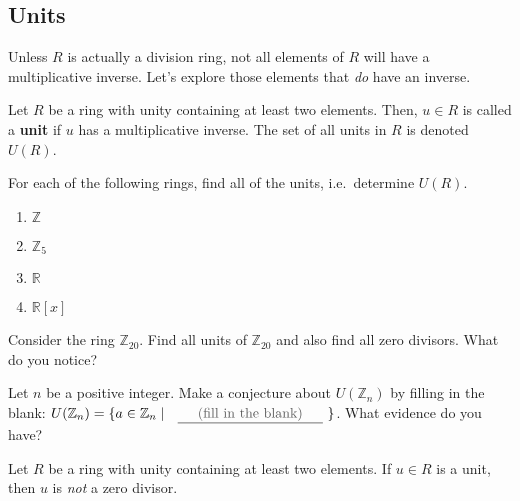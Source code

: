 \subsection{Units}

Unless $R$ is actually a division ring, not all elements of $R$ will have a multiplicative inverse. Let's explore those elements that \emph{do} have an inverse.

\begin{definition}
Let $R$ be a ring with unity containing at least two elements. Then, $u\in R$ is called a \textbf{unit} if $u$ has a multiplicative inverse. The set of all units in $R$ is denoted $U(R)$.
\end{definition}


\begin{problem}
For each of the following rings, find all of the units, i.e.~determine $U(R)$.
\begin{multicols}{2}
\begin{enumerate}
\item $\mathbb{Z}$
\item $\mathbb{Z}_{5}$
\item $\mathbb{R}$
\item $\mathbb{R}[x]$
\end{enumerate}
\end{multicols}
\end{problem}

\begin{problem}
Consider the ring $\mathbb{Z}_{20}$. Find all units of $\mathbb{Z}_{20}$ and also find all zero divisors. What do you notice?
\end{problem}

\begin{problem}
Let $n$ be a positive integer. Make a conjecture about $U(\mathbb{Z}_n)$ by filling in the blank:  $U(\mathbb{Z}_n) = \{a\in \mathbb{Z}_n\mid\text{ \fillInBlank{fill in the blank} }\}$. What evidence do you have?
\end{problem}

\begin{theorem}\label{thm.UnitIsNotZeroDivisor}
Let $R$ be a ring with unity containing at least two elements. If $u\in R$ is a unit, then $u$ is \emph{not} a zero divisor.
\end{theorem}

